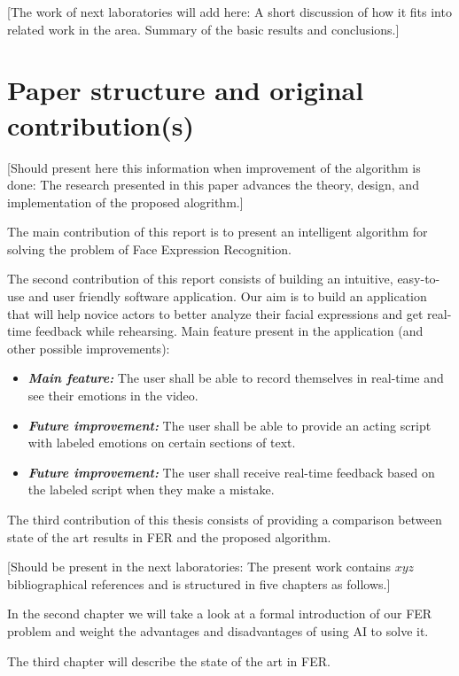 \documentclass[runningheads,a4paper,11pt]{report}
\begin{document}
[The work of next laboratories will add here: 
A short discussion of how it fits into related work in the area. Summary of the basic results and conclusions.]


\section{Paper structure and original contribution(s)}
\label{section:structure}

[Should present here this information when improvement of the algorithm is done: The research presented in this paper advances the theory, design, and implementation of the proposed alogrithm.]

The main contribution of this report is to present an intelligent algorithm for solving the problem of Face Expression Recognition.

The second contribution of this report consists of building an intuitive, easy-to-use and user friendly software application. Our aim is to build an application that will help novice actors to better analyze their facial expressions and get real-time feedback while rehearsing.
Main feature present in the application (and other possible improvements):
\begin{itemize}
	\item \textbf{\emph{Main feature:}} The user shall be able to record themselves in real-time and see their emotions in the video.
	\item \textbf{\emph{Future improvement:}} The user shall be able to provide an acting script with labeled emotions on certain sections of text.
	\item \textbf{\emph{Future improvement:}} The user shall receive real-time feedback based on the labeled script when they make a mistake.
\end{itemize}

The third contribution of this thesis consists of providing a comparison between state of the art results in FER and the proposed algorithm.

[Should be present in the next laboratories: The present work contains $xyz$ bibliographical references and is structured in five chapters as follows.]

In the second chapter we will take a look at a formal introduction of our FER problem and weight the advantages and disadvantages of using AI to solve it.

The third chapter will describe the state of the art in FER.
\end{document}
